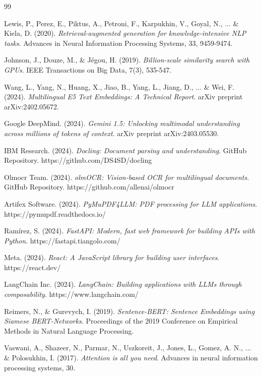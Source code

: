 \documentclass[../DoAn.tex]{subfiles}
\begin{document}
\begin{thebibliography}{99}

Lewis, P., Perez, E., Piktus, A., Petroni, F., Karpukhin, V., Goyal, N., ... \& Kiela, D. (2020). 
\textit{Retrieval-augmented generation for knowledge-intensive NLP tasks}. 
Advances in Neural Information Processing Systems, 33, 9459-9474.

Johnson, J., Douze, M., \& Jégou, H. (2019). 
\textit{Billion-scale similarity search with GPUs}. 
IEEE Transactions on Big Data, 7(3), 535-547.

Wang, L., Yang, N., Huang, X., Jiao, B., Yang, L., Jiang, D., ... \& Wei, F. (2024). 
\textit{Multilingual E5 Text Embeddings: A Technical Report}. 
arXiv preprint arXiv:2402.05672.

Google DeepMind. (2024). 
\textit{Gemini 1.5: Unlocking multimodal understanding across millions of tokens of context}. 
arXiv preprint arXiv:2403.05530.

IBM Research. (2024). 
\textit{Docling: Document parsing and understanding}. 
GitHub Repository. https://github.com/DS4SD/docling

Olmocr Team. (2024). 
\textit{olmOCR: Vision-based OCR for multilingual documents}. 
GitHub Repository. https://github.com/allenai/olmocr

Artifex Software. (2024). 
\textit{PyMuPDF4LLM: PDF processing for LLM applications}. 
https://pymupdf.readthedocs.io/

Ramírez, S. (2024). 
\textit{FastAPI: Modern, fast web framework for building APIs with Python}. 
https://fastapi.tiangolo.com/

Meta. (2024). 
\textit{React: A JavaScript library for building user interfaces}. 
https://react.dev/

LangChain Inc. (2024). 
\textit{LangChain: Building applications with LLMs through composability}. 
https://www.langchain.com/

Reimers, N., \& Gurevych, I. (2019). 
\textit{Sentence-BERT: Sentence Embeddings using Siamese BERT-Networks}. 
Proceedings of the 2019 Conference on Empirical Methods in Natural Language Processing.

Vaswani, A., Shazeer, N., Parmar, N., Uszkoreit, J., Jones, L., Gomez, A. N., ... \& Polosukhin, I. (2017). 
\textit{Attention is all you need}. 
Advances in neural information processing systems, 30.


\end{thebibliography}
\end{document}
